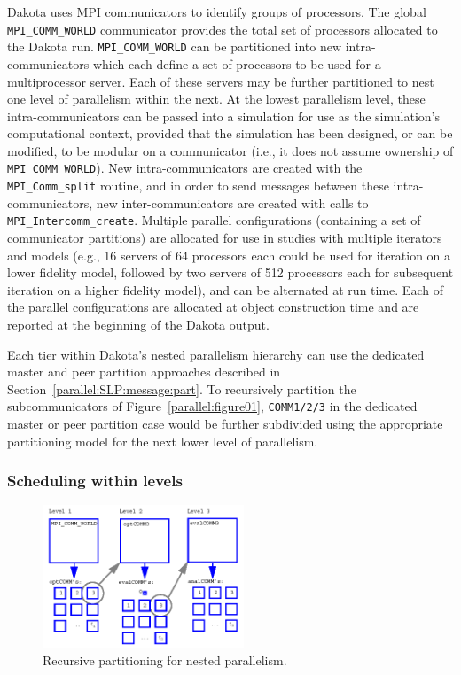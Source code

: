 Dakota uses MPI communicators to identify groups of processors. The
global \texttt{MPI\_COMM\_WORLD} communicator provides the total set
of processors allocated to the Dakota run. \texttt{MPI\_COMM\_WORLD}
can be partitioned into new intra-communicators which each define a
set of processors to be used for a multiprocessor server. Each of
these servers may be further partitioned to nest one level of
parallelism within the next. At the lowest parallelism level, these
intra-communicators can be passed into a simulation for use as the
simulation's computational context, provided that the simulation has
been designed, or can be modified, to be modular on a communicator
(i.e., it does not assume ownership of \texttt{MPI\_COMM\_WORLD}). New
intra-communicators are created with the \texttt{MPI\_Comm\_split}
routine, and in order to send messages between these
intra-communicators, new inter-communicators are created with calls to
\texttt{MPI\_Intercomm\_create}. %
Multiple parallel configurations (containing a set of communicator
partitions) are allocated for use in studies with multiple iterators
and models (e.g., 16 servers of 64 processors each could be used for
iteration on a lower fidelity model, followed by two servers of 512
processors each for subsequent iteration on a higher fidelity model),
and can be alternated at run time.  Each of the parallel
configurations are allocated at object construction time and are
reported at the beginning of the Dakota output.

Each tier within Dakota's nested parallelism hierarchy can use the
dedicated master and peer partition approaches described in
Section~\ref{parallel:SLP:message:part}. To recursively partition the
subcommunicators of Figure~\ref{parallel:figure01},
\texttt{COMM1/2/3} in the dedicated master or peer partition case
would be further subdivided using the appropriate partitioning model
for the next lower level of parallelism.


\subsubsection{Scheduling within levels}\label{parallel:MLP:message:scheduling}

\begin{figure}[ht]
  \centering
  \includegraphics[width=60mm]{images/recursive_partitioning}
  \caption{Recursive partitioning for nested parallelism.}
  \label{parallel:figure02}
\end{figure}

